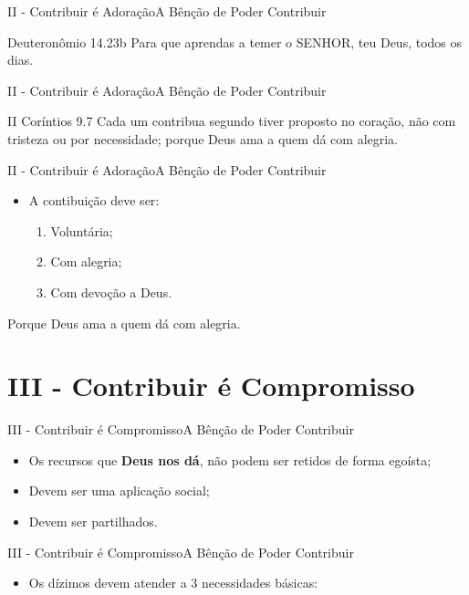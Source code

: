 \documentclass[14pt,aspectratio=169]{beamer}
\newcommand{\TT}{A Bênção de Poder Contribuir}
\newcommand{\PII}{II - Contribuir é Adoração}
\newcommand{\PIII}{III - Contribuir é Compromisso}
\begin{document}
\begin{frame}{\PII}{\TT}
 \begin{block}{Deuteronômio 14.23b}
Para que aprendas a temer o SENHOR, teu Deus, todos os dias.
 \end{block}
\end{frame}

\begin{frame}{\PII}{\TT}
 \begin{block}{II Coríntios 9.7}
Cada um contribua segundo tiver proposto no coração, não com tristeza ou por necessidade; porque Deus ama a quem dá com alegria.
  \end{block}
\end{frame}

\begin{frame}{\PII}{\TT}
 \begin{itemize}
  \item A contibuição deve ser:\pause
   \begin{enumerate}
   \Large
    \item Voluntária;\pause
    \item Com alegria;\pause
    \item Com devoção a Deus.
   \end{enumerate}    
 \end{itemize}
 \begin{center}
Porque Deus ama a quem dá com alegria.
 \end{center}
\end{frame}

\section{\PIII}
\begin{frame}{\PIII}{\TT}\pause
 \begin{itemize}
  \item Os recursos que \textbf{Deus nos dá}, não podem ser retidos de forma egoísta;\pause
  \item Devem ser uma aplicação social;\pause
  \item Devem ser partilhados.
 \end{itemize}
\end{frame}

\begin{frame}{\PIII}{\TT}
 \begin{itemize}
  \item Os dízimos devem atender a 3 necessidades básicas:
 \end{itemize}
\end{frame}
\end{document}
